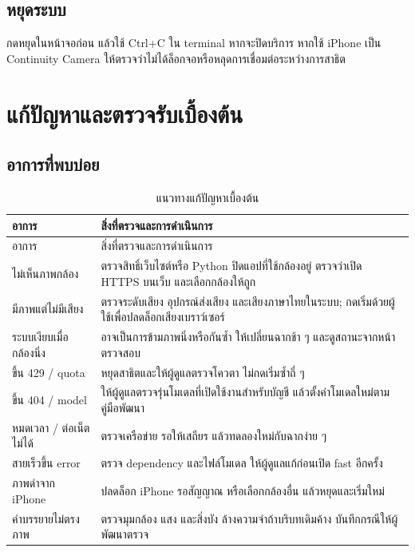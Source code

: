 \section{หยุดระบบ}
กดหยุดในหน้าจอก่อน แล้วใช้ Ctrl+C ใน terminal หากจะปิดบริการ หากใช้ iPhone เป็น Continuity Camera ให้ตรวจว่าไม่ได้ล็อกจอหรือหลุดการเชื่อมต่อระหว่างการสาธิต

\chapter{แก้ปัญหาและตรวจรับเบื้องต้น}
\section{อาการที่พบบ่อย}
\begin{longtable}{p{36mm}p{110mm}}
\caption{แนวทางแก้ปัญหาเบื้องต้น}\\\toprule อาการ & สิ่งที่ตรวจและการดำเนินการ\\\midrule\endfirsthead
\toprule อาการ & สิ่งที่ตรวจและการดำเนินการ\\\midrule\endhead
ไม่เห็นภาพกล้อง & ตรวจสิทธิ์เว็บไซต์หรือ Python ปิดแอปที่ใช้กล้องอยู่ ตรวจว่าเปิด HTTPS บนเว็บ และเลือกกล้องให้ถูก\\
มีภาพแต่ไม่มีเสียง & ตรวจระดับเสียง อุปกรณ์ส่งเสียง และเสียงภาษาไทยในระบบ; กดเริ่มด้วยผู้ใช้เพื่อปลดล็อกเสียงเบราว์เซอร์\\
ระบบเงียบเมื่อกล้องนิ่ง & อาจเป็นการข้ามภาพนิ่งหรือกันซ้ำ ให้เปลี่ยนฉากช้า ๆ และดูสถานะจากหน้าตรวจสอบ\\
ขึ้น 429 / quota & หยุดสาธิตและให้ผู้ดูแลตรวจโควตา ไม่กดเริ่มซ้ำถี่ ๆ\\
ขึ้น 404 / model & ให้ผู้ดูแลตรวจรุ่นโมเดลที่เปิดใช้งานสำหรับบัญชี แล้วตั้งค่าโมเดลใหม่ตามคู่มือพัฒนา\\
หมดเวลา / ต่อเน็ตไม่ได้ & ตรวจเครือข่าย รอให้เสถียร แล้วทดลองใหม่กับฉากง่าย ๆ\\
สายเร็วขึ้น error & ตรวจ dependency และไฟล์โมเดล ให้ผู้ดูแลแก้ก่อนเปิด fast อีกครั้ง\\
ภาพดำจาก iPhone & ปลดล็อก iPhone รอสัญญาณ หรือเลือกกล้องอื่น แล้วหยุดและเริ่มใหม่\\
คำบรรยายไม่ตรงภาพ & ตรวจมุมกล้อง แสง และสิ่งบัง ล้างความจำถ้าบริบทเดิมค้าง บันทึกกรณีให้ผู้พัฒนาตรวจ\\\bottomrule
\end{longtable}

